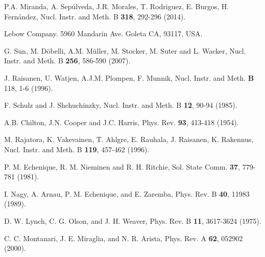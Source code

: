 \documentclass[aps,pra,reprint,groupedaddress,showpacs,showkeys]{revtex4-1} %
\providecommand{\DIFaddbegin}{} %
\providecommand{\DIFaddend}{} %
\newcommand{\DIFaddincludegraphics}[2][]{{\color{blue}\fbox{\DIFOincludegraphics[#1]{#2}}}} %
\DeclareRobustCommand{\DIFaddbegin}{\DIFOaddbegin \let\includegraphics\DIFaddincludegraphics} %
\DeclareRobustCommand{\DIFaddend}{\DIFOaddend \let\includegraphics\DIFOincludegraphics} %
\begin{document}
\begin{thebibliography}{00}
\DIFaddend %
 P.A. Miranda, A. Sep\'ulveda, J.R. Morales, 
T. Rodriguez, E. Burgos, H. Fern\'andez,
Nucl. Instr. and Meth. B \textbf{318}, 292-296  (2014).
\DIFaddbegin 

\DIFaddend {} 
Lebow Company. 5960 Mandarin Ave. Goleta CA, 93117, USA.

G. Sun, M. D\"{o}belli, A.M. M\"{u}ller, M. Stocker, M. Suter and 
L. Wacker, 
Nucl. Instr. and Meth. B \textbf{256}, 586-590 (2007).
\DIFaddbegin 

\DIFaddend {} 
J. Raisanen, U. Watjen, A.J.M. Plompen, F. Munnik, 
Nucl. Instr. and Meth. \textbf{B} 118, 1-6  (1996).
\DIFaddbegin 

\DIFaddend {} 
F. Schulz and J. Shchuchinzky, 
Nucl. Instr. and Meth. B \textbf{12},  90-94 (1985).
\DIFaddbegin 

\DIFaddend {} 
A.B. Chilton, J.N. Cooper and J.C. Harris, 
Phys. Rev. \textbf{93}, 413-418  (1954).
\DIFaddbegin 

\DIFaddend {} 
M. Rajatora, K. Vakevainen, T. Ahlgre, E. Rauhala, J. Raisanen, 
K. Rakennus, 
Nucl. Instr. and Meth. B \textbf{119}, 457-462 (1996).
\DIFaddbegin 

\DIFaddend %
P. M. Echenique, R. M. Nieminen and R. H. Ritchie, 
Sol. State Comm. \textbf{37}, 779-781 (1981).
\DIFaddbegin 

\DIFaddend {} 
I. Nagy, A. Arnau, P. M. Echenique, and E. Zaremba, 
Phys. Rev. B \textbf{40}, 11983 (1989).
\DIFaddbegin 

\DIFaddend {} 
D. W. Lynch, C. G. Olson, and J. H. Weaver, 
Phys. Rev. B \textbf{11}, 3617-3624 (1975).
\DIFaddbegin 

\DIFaddend {} 
C. C. Montanari, J. E. Miraglia, and N. R. Arista, 
Phys. Rev. A \textbf{62}, 052902 (2000).
\DIFaddbegin 


\end{thebibliography}
\end{document}
